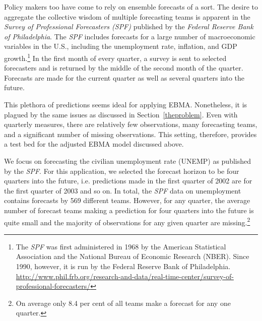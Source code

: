 \documentclass[12pt,fullpage,endnotes]{article}
\begin{document}
Policy makers too have come to rely on ensemble forecasts of a sort.
The desire to aggregate the collective wisdom of multiple forecasting
teams is apparent in the \textit{Survey of Professional Forecasters
  (SPF)} published by the \textit{Federal Reserve Bank of
  Philadelphia}.  The \textit{SPF} includes forecasts for a large
number of macroeconomic variables in the U.S., including the
unemployment rate, inflation, and GDP growth.\footnote{The
  \textit{SPF} was first administered in 1968 by the American
  Statistical Association and the National Bureau of Economic Research
  (NBER).  Since 1990, however, it is run by the Federal Reserve Bank
  of Philadelphia.
  \url{http://www.phil.frb.org/research-and-data/real-time-center/survey-of-professional-forecasters/}}
In the first month of every quarter, a survey is sent to selected
forecasters and is returned by the middle of the second month of the
quarter. Forecasts are made for the current quarter as well as several
quarters into the future.

This plethora of predictions seems ideal for applying EBMA.
Nonetheless, it is plagued by the same issues as discussed in
Section~\ref{theproblem}.  Even with quarterly measures, there are
relatively few observations, many forecasting teams, and a significant
number of missing observations.  This setting, therefore, provides a
test bed for the adjusted EBMA model discussed above.

We focus on forecasting the civilian unemployment rate (UNEMP) as
published by the \textit{SPF}. For this application, we selected the
forecast horizon to be four quarters into the future, i.e. predictions
made in the first quarter of 2002 are for the first quarter of 2003
and so on. In total, the \textit{SPF} data on unemployment contains
forecasts by 569 different teams. However, for any quarter, the
average number of forecast teams making a prediction for four quarters
into the future is quite small and the majority of observations for
any given quarter are missing.\footnote{On average only 8.4 per cent
  of all teams make a forecast for any one quarter.}
\end{document}
